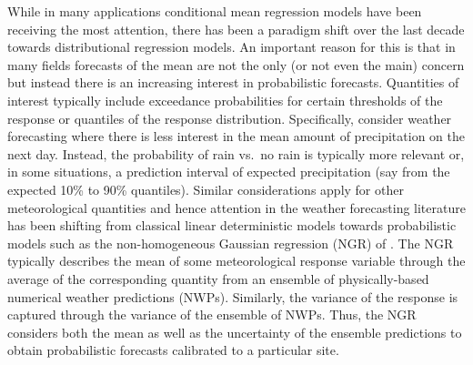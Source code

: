 \documentclass[aoas, preprint]{imsart}
\numberwithin{equation}{subsection}
\begin{document}
While in many applications conditional mean regression models have been receiving
the most attention, there has been a paradigm shift over the last decade towards
distributional regression models. An important reason for this is that in many
fields forecasts of the mean are not the only (or not even the main) concern but
instead there is an increasing interest in probabilistic forecasts. Quantities of
interest typically include exceedance probabilities for certain thresholds of the
response or quantiles of the response distribution. Specifically, consider
weather forecasting where there is less interest in the mean amount of
precipitation on the next day. Instead, the probability of rain vs.\ no rain
is typically more relevant or, in some situations, a prediction interval of
expected precipitation (say from the expected 10\% to 90\% quantiles). Similar
considerations apply for other meteorological quantities and hence attention
in the weather forecasting literature has been shifting from classical linear 
deterministic models \citep{Glahn+Lowry:1972} towards probabilistic models such as the
non-homogeneous Gaussian regression (NGR) of \cite{Gneiting+Raftery+Westveld:2005}.
The NGR typically describes the mean of some meteorological response variable through
the average of the corresponding quantity from an ensemble of physically-based
numerical weather predictions (NWPs). Similarly, the variance of the response
is captured through the variance of the ensemble of NWPs. Thus, the NGR
considers both the mean as well as the uncertainty of the ensemble predictions
to obtain probabilistic forecasts calibrated to a particular site.
\end{document}
